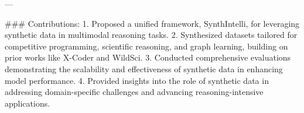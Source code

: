 ---

### Contributions:
1. Proposed a unified framework, SynthIntelli, for leveraging synthetic data in multimodal reasoning tasks.
2. Synthesized datasets tailored for competitive programming, scientific reasoning, and graph learning, building on prior works like X-Coder and WildSci.
3. Conducted comprehensive evaluations demonstrating the scalability and effectiveness of synthetic data in enhancing model performance.
4. Provided insights into the role of synthetic data in addressing domain-specific challenges and advancing reasoning-intensive applications.

